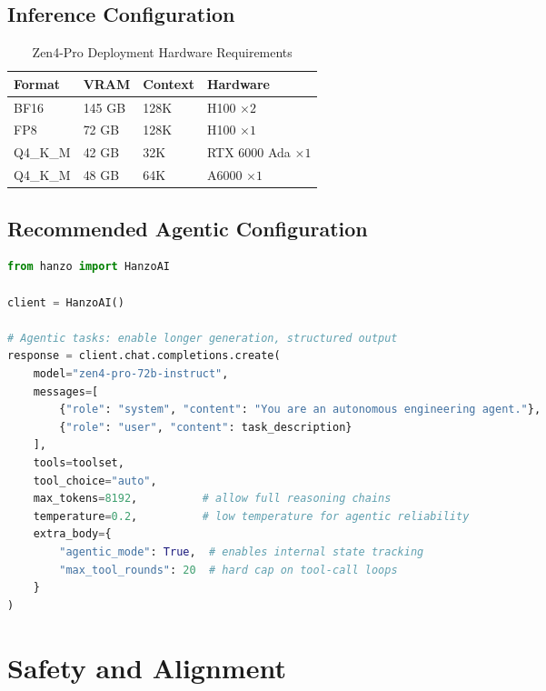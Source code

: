 \documentclass[11pt,a4paper]{article}
\begin{document}
\subsection{Inference Configuration}

\begin{table}[H]
\centering
\begin{tabular}{llll}
\toprule
\textbf{Format} & \textbf{VRAM} & \textbf{Context} & \textbf{Hardware} \\
\midrule
BF16             & 145 GB & 128K  & H100 $\times 2$ \\
FP8              & 72 GB  & 128K  & H100 $\times 1$ \\
Q4\_K\_M         & 42 GB  & 32K   & RTX 6000 Ada $\times 1$ \\
Q4\_K\_M         & 48 GB  & 64K   & A6000 $\times 1$ \\
\bottomrule
\end{tabular}
\caption{Zen4-Pro Deployment Hardware Requirements}
\end{table}

\subsection{Recommended Agentic Configuration}

\begin{lstlisting}[language=Python, caption=Zen4-Pro Agentic Task Configuration]
from hanzo import HanzoAI

client = HanzoAI()

# Agentic tasks: enable longer generation, structured output
response = client.chat.completions.create(
    model="zen4-pro-72b-instruct",
    messages=[
        {"role": "system", "content": "You are an autonomous engineering agent."},
        {"role": "user", "content": task_description}
    ],
    tools=toolset,
    tool_choice="auto",
    max_tokens=8192,          # allow full reasoning chains
    temperature=0.2,          # low temperature for agentic reliability
    extra_body={
        "agentic_mode": True,  # enables internal state tracking
        "max_tool_rounds": 20  # hard cap on tool-call loops
    }
)
\end{lstlisting}

\section{Safety and Alignment}
\end{document}

